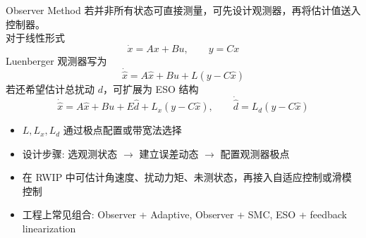 \begin{frame}{Observer Method}
    \scriptsize
    若并非所有状态可直接测量，可先设计观测器，再将估计值送入控制器。\\[0.4em]
    对于线性形式
    \[
    \dot x = A x + B u,\qquad y = C x
    \]
    Luenberger 观测器写为
    \[
    \dot{\hat x}=A\hat x+Bu+L(y-C\hat x)
    \]
    若还希望估计总扰动 $d$，可扩展为 ESO 结构
    \[
    \dot{\hat x}=A\hat x+Bu+E\hat d+L_x(y-C\hat x),\qquad
    \dot{\hat d}=L_d(y-C\hat x)
    \]
    \begin{itemize}
        \setlength{\itemsep}{0.3em}
        \item $L,L_x,L_d$ 通过极点配置或带宽法选择
        \item 设计步骤: 选观测状态 $\rightarrow$ 建立误差动态 $\rightarrow$ 配置观测器极点
        \item 在 RWIP 中可估计角速度、扰动力矩、未测状态，再接入自适应控制或滑模控制
        \item 工程上常见组合: Observer + Adaptive, Observer + SMC, ESO + feedback linearization
    \end{itemize}
\end{frame}
